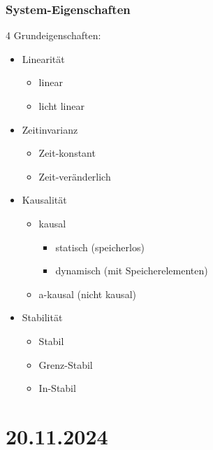 \documentclass[a4paper]{article}
\begin{document}
\subsubsection*{System-Eigenschaften}
4 Grundeigenschaften:
\begin{itemize}
    \item Linearität
    \begin{itemize}
        \item linear
        \item licht linear
    \end{itemize}
    
    \item Zeitinvarianz
    \begin{itemize}
        \item Zeit-konstant
        \item Zeit-veränderlich
    \end{itemize}
    
    \item Kausalität
    \begin{itemize}
        \item kausal
        \begin{itemize}
            \item statisch (speicherlos)
            \item dynamisch (mit Speicherelementen)
        \end{itemize}
        \item a-kausal (nicht kausal)
    \end{itemize}
    
    \item Stabilität
    \begin{itemize}
        \item Stabil
        \item Grenz-Stabil
        \item In-Stabil
    \end{itemize}
\end{itemize}

\newpage
\section*{20.11.2024}
\end{document}
